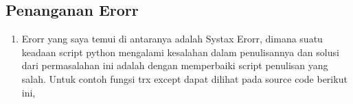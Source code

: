 \subsection{Penanganan Erorr}
\begin{enumerate}

\item Erorr yang saya temui di antaranya adalah Systax Erorr, dimana suatu keadaan script python mengalami kesalahan dalam penulisannya dan solusi dari permasalahan ini adalah dengan memperbaiki script penulisan yang salah. Untuk contoh fungsi trx except dapat dilihat pada source code berikut ini,

	

\end{enumerate}
